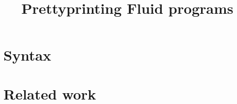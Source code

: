 \documentclass[preprint,draft,acmsmall,screen,a4paper]{acmart}
\begin{document}
\title{Prettyprinting Fluid programs}
\maketitle

\section{Syntax}








\section{Related work}
\cite{hughes95}
\clearpage
\pagebreak
\clearpage

\end{document}
